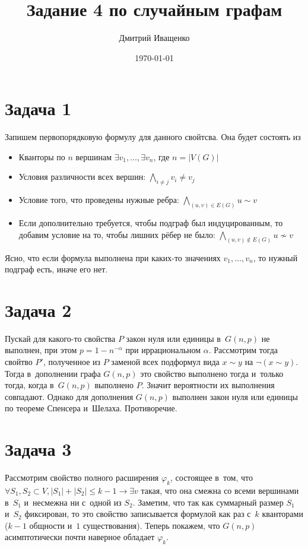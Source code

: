 \documentclass{article}
\theoremstyle{definition}
\theoremstyle{remark}
\renewcommand{\le}{\leqslant}
\renewcommand{\phi}{\varphi}
\begin{document}
\title{Задание 4 по случайным графам}
\author{Дмитрий Иващенко}
\date{\today}
\maketitle

\section*{Задача 1}

Запишем первопорядковую формулу для данного свойтсва. Она будет состоять из
\begin{itemize}
	\item Кванторы по $n$ вершинам $\exists v_1, \ldots, \exists v_n$, где $n = |V(G)|$
	\item Условия различности всех вершин: $\bigwedge\limits_{i \ne j} v_i \ne v_j$
	\item Условие того, что проведены нужные ребра: $\bigwedge\limits_{(u,v) \in E(G)} u \sim v$
	\item Если дополнительно требуется, чтобы подграф был индуцированным, то добавим условие на то,
		чтобы лишних рёбер не было: $\bigwedge\limits_{(u, v) \notin E(G)} u \not\sim v$
\end{itemize}

Ясно, что если формула выполнена при каких-то значениях $v_1, \ldots, v_n$, то нужный подграф есть,
иначе его нет.

\section*{Задача 2}

Пускай для какого-то свойства $P$ закон нуля или единицы в~$G(n, p)$ не выполнен, при этом $p = 1 -
n^{-\alpha}$ при иррациональном $\alpha$. Рассмотрим тогда	свойтво $P'$, полученное из $P$ заменой всех
подформул вида $x \sim y$ на $\neg (x \sim y)$. Тогда в~дополнении графа $G(n, p)$ это свойство
выполнено тогда и~только тогда, когда в~$G(n, p)$ выполнено $P$. Значит вероятности их выполнения
совпадают. Однако для дополнения $G(n, p)$ выполнен закон нуля или единицы по теореме Спенсера
и~Шелаха. Противоречие.

\section*{Задача 3}

Рассмотрим свойство полного расширения $\phi_k$, состоящее в~том, что
$\forall S_1, S_2 \subset V, |S_1| +
|S_2| \le k - 1 \rightarrow \exists v$ такая, что она смежна со всеми вершинами в~$S_1$ и~несмежна
ни с~одной из $S_2$. Заметим, что так как суммарный размер $S_1$ и~$S_2$ фиксирован, то это свойство
записывается формулой как раз с~$k$ кванторами ($k - 1$ общности и~$1$ существования). Теперь
покажем, что $G(n, p)$ асимптотически почти наверное обладает $\phi_k$.
\end{document}
